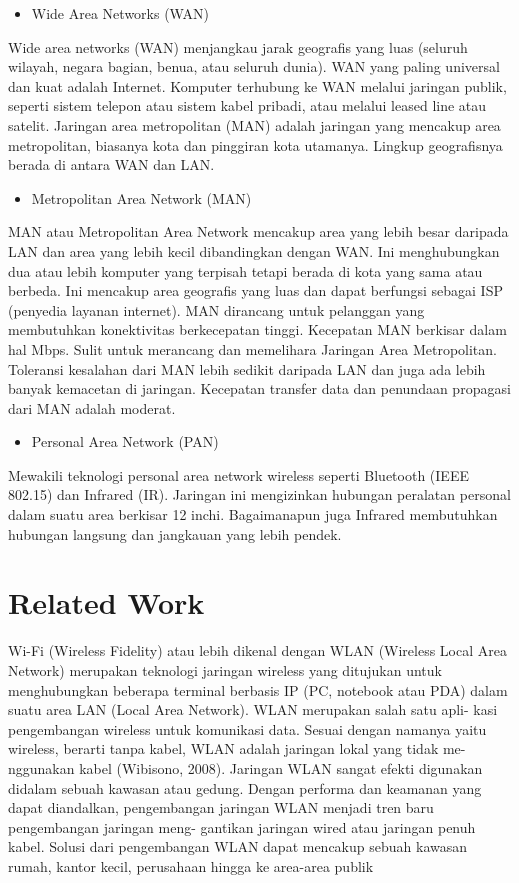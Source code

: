 \documentclass[conference]{IEEEtran}
\begin{document}
\begin{itemize}
    \item Wide Area Networks (WAN)
\end{itemize}
Wide area networks (WAN) menjangkau jarak geografis yang luas (seluruh wilayah, negara bagian, benua, atau seluruh dunia). 
WAN yang paling universal dan kuat adalah Internet.
Komputer terhubung ke WAN melalui jaringan publik, seperti sistem telepon atau sistem kabel pribadi, atau melalui leased line atau satelit. 
Jaringan area metropolitan (MAN) adalah jaringan yang mencakup area metropolitan, biasanya kota dan pinggiran kota utamanya. 
Lingkup geografisnya berada di antara WAN dan LAN.

\begin{itemize}
    \item Metropolitan Area Network (MAN)
\end{itemize}
MAN atau Metropolitan Area Network mencakup area yang lebih besar daripada LAN dan area yang lebih kecil dibandingkan dengan WAN.
Ini menghubungkan dua atau lebih komputer yang terpisah tetapi berada di kota yang sama atau berbeda. 
Ini mencakup area geografis yang luas dan dapat berfungsi sebagai ISP (penyedia layanan internet).
MAN dirancang untuk pelanggan yang membutuhkan konektivitas berkecepatan tinggi.
Kecepatan MAN berkisar dalam hal Mbps. Sulit untuk merancang dan memelihara Jaringan Area Metropolitan. 
Toleransi kesalahan dari MAN lebih sedikit daripada LAN dan juga ada lebih banyak kemacetan di jaringan.
Kecepatan transfer data dan penundaan propagasi dari MAN adalah moderat.

\begin{itemize}
    \item Personal Area Network (PAN)
\end{itemize}
Mewakili teknologi personal area network wireless seperti Bluetooth (IEEE 802.15) dan Infrared (IR). 
Jaringan ini mengizinkan hubungan peralatan personal dalam suatu area berkisar 12 inchi. 
Bagaimanapun juga Infrared membutuhkan hubungan langsung dan jangkauan yang lebih pendek.

\section{Related Work}
Wi-Fi (Wireless Fidelity) atau lebih dikenal dengan
WLAN (Wireless Local Area Network) merupakan
teknologi jaringan wireless yang ditujukan untuk
menghubungkan beberapa terminal berbasis IP (PC,
notebook atau PDA) dalam suatu area LAN (Local
Area Network). WLAN merupakan salah satu apli-
kasi pengembangan wireless untuk komunikasi data.
Sesuai dengan namanya yaitu wireless, berarti tanpa
kabel, WLAN adalah jaringan lokal yang tidak me-
nggunakan kabel (Wibisono, 2008). Jaringan WLAN
sangat efekti digunakan didalam sebuah kawasan
atau gedung. Dengan performa dan keamanan yang
dapat diandalkan, pengembangan jaringan WLAN
menjadi tren baru pengembangan jaringan meng-
gantikan jaringan wired atau jaringan penuh kabel.
Solusi dari pengembangan WLAN dapat mencakup
sebuah kawasan rumah, kantor kecil, perusahaan
hingga ke area-area publik
\end{document}
